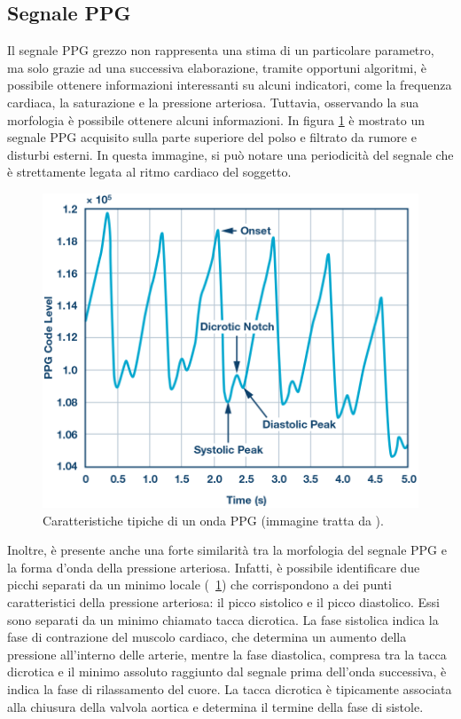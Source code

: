 \subsection{Segnale PPG}
Il segnale PPG grezzo non rappresenta una stima di un particolare parametro, ma solo grazie ad una successiva elaborazione, tramite opportuni algoritmi, è possibile ottenere informazioni interessanti su alcuni indicatori, come la frequenza cardiaca, la saturazione e la pressione arteriosa.
Tuttavia, osservando la sua morfologia è possibile ottenere alcuni informazioni\cite{Foroozan2018}. In figura \ref{fig:Descrizione_Segnale_PPG} è mostrato un segnale PPG acquisito sulla parte superiore del polso e filtrato da rumore e disturbi esterni. In questa immagine, si può notare una periodicità del segnale che è strettamente legata al ritmo cardiaco del soggetto.
\begin{figure}[h]
	\centering
	\includegraphics[width=0.7\linewidth]{ImageFiles/Misure Preliminari/descrizione_segnale_ppg}
	\caption{Caratteristiche tipiche di un onda PPG (immagine tratta da \cite{Ppgsignal}).}
	\label{fig:Descrizione_Segnale_PPG}
\end{figure}
Inoltre, è presente anche una forte similarità tra la morfologia del segnale PPG e la forma d'onda della pressione arteriosa. Infatti, è possibile identificare due picchi separati da un minimo locale (\Fig~\ref{fig:Descrizione_Segnale_PPG}) che corrispondono a dei punti caratteristici della pressione arteriosa: il picco sistolico e il picco diastolico. Essi sono separati da un minimo chiamato tacca dicrotica. La fase sistolica indica la fase di contrazione del muscolo cardiaco, che determina un aumento della pressione all'interno delle arterie, mentre la fase diastolica, compresa tra la tacca dicrotica e il minimo assoluto raggiunto dal segnale prima dell'onda successiva, è indica la fase di rilassamento del cuore\cite{Singh2017}. La tacca dicrotica è tipicamente associata alla chiusura della valvola aortica e determina il termine della fase di sistole\cite{Gamrah2020}.

